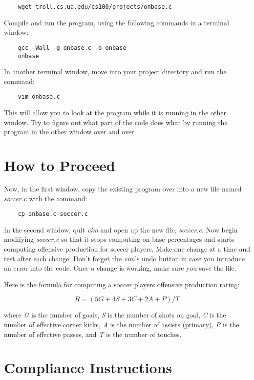 \documentclass[12pt]{article}
\begin{document}
\begin{verbatim}
    wget troll.cs.ua.edu/cs100/projects/onbase.c
\end{verbatim}

Compile and run the program, using the following commands in a terminal
window:

\begin{verbatim}
    gcc -Wall -g onbase.c -o onbase 
    onbase
\end{verbatim}

In another terminal window, move into your project directory and run
the command:

\begin{verbatim}
    vim onbase.c
\end{verbatim}

This will allow you to look at the program while it is running in the
other window.
Try to figure out what part of the code does what by running the program
in the other window over and over.

\section*{How to Proceed}

Now, in the first window,
copy the existing program over into a new file named {\it soccer.c}
with the command:

\begin{verbatim}
    cp onbase.c soccer.c
\end{verbatim}

In the second window, quit {\it vim} and open up the new file, {\it soccer.c}.
Now begin modifying {\it soccer.c} so that it stops computing 
on-base percentages
and starts computing offensive production for soccer players.
Make one change at a time and test after each change.
Don't forget the {\it vim}'s undo button in case you introduce an error
into the code. Once a change is working, make sure you save the file.

Here is the 
formula for computing a soccer players offensive production rating:

\[
R = (5 G + 4 S + 3 C + 2 A + P) / T
\]

where
{\it G} is the number of goals,
{\it S} is the number of shots on goal,
{\it C} is the number of effective corner kicks,
{\it A} is the number of assists (primary),
{\it P} is the number of effective passes, and
{\it T} is the number of touches.

\section*{Compliance Instructions}
\end{document}
